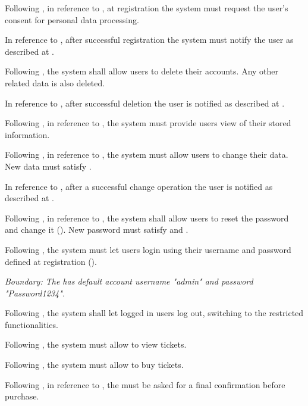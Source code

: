 Following , in reference to , at registration the system must request the user's consent for personal 
data processing.

In reference to , after successful registration the system must notify the user as described at .

Following , the system shall allow users to delete their accounts. Any other related data is also deleted.

In reference to , after successful deletion the user is notified as described at .

Following , in reference to , the system must provide users view of their stored information.

Following , in reference to , the system must allow users to change their data. New data must 
satisfy .

In reference to , after a successful change operation the user is notified as described at .

Following , in reference to , the system shall allow users to reset the password and change it (). 
New password must satisfy  and .

Following , the system must let users login using their username and password defined at registration ().

\it{Boundary:} The  has default account username "admin" and password "Password1234".

Following , the system shall let logged in users log out, switching to the restricted  
functionalities. 

Following , the system must allow  to view tickets. 

Following , the system must allow  to buy tickets.

Following , in reference to , the  must be asked for a final confirmation before purchase.

